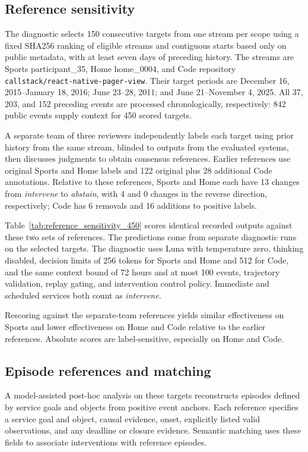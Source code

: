 \subsection{Reference sensitivity}

The diagnostic selects 150 consecutive targets from one stream per scope using a fixed SHA256 ranking of eligible streams and contiguous starts based only on public metadata, with at least seven days of preceding history.
The streams are Sports participant\_35, Home home\_0004, and Code repository \texttt{callstack/react-native-pager-view}.
Their target periods are December 16, 2015--January 18, 2016; June 23--28, 2011; and June 21--November 4, 2025.
All 37, 203, and 152 preceding events are processed chronologically, respectively: 842 public events supply context for 450 scored targets.

A separate team of three reviewers independently labels each target using prior history from the same stream, blinded to outputs from the evaluated systems, then discusses judgments to obtain consensus references.
Earlier references use original Sports and Home labels and 122 original plus 28 additional Code annotations.
Relative to these references, Sports and Home each have 13 changes from \emph{intervene} to \emph{abstain}, with 4 and 0 changes in the reverse direction, respectively; Code has 6 removals and 16 additions to positive labels.


Table~\ref{tab:reference_sensitivity_450} scores identical recorded \system{} outputs against these two sets of references.
The predictions come from separate diagnostic runs on the selected targets.
The diagnostic uses Luna with temperature zero, thinking disabled, decision limits of 256 tokens for Sports and Home and 512 for Code, and the same context bound of 72 hours and at most 100 events, trajectory validation, replay gating, and intervention control policy.
Immediate and scheduled services both count as \emph{intervene}.

Rescoring against the separate-team references yields similar effectiveness on Sports and lower effectiveness on Home and Code relative to the earlier references.
Absolute scores are label-sensitive, especially on Home and Code.

\subsection{Episode references and matching}
\label{app:episode_review_450}

A model-assisted post-hoc analysis on these targets reconstructs episodes defined by service goals and objects from positive event anchors.
Each reference specifies a service goal and object, causal evidence, onset, explicitly listed valid observations, and any deadline or closure evidence.
Semantic matching uses these fields to associate interventions with reference episodes.

